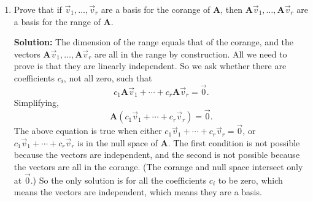 \documentclass[11pt,fleqn]{article}
\begin{document}
\begin{enumerate}
\item Prove that if $\vec{v}_1,\ldots,\vec{v}_r$ are a basis for the corange of $\mathbf{A}$, then $\mathbf{A}\vec{v}_1,\ldots,\mathbf{A}\vec{v}_r$ are a basis for the range of $\mathbf{A}$.

{\bf Solution:} The dimension of the range equals that of the corange, and the vectors $\mathbf{A}\vec{v}_1,\ldots,\mathbf{A}\vec{v}_r$ are all in the range by construction. All we need to prove is that they are linearly independent. So we ask whether there are coefficients $c_i$, not all zero, such that
\[c_1 \mathbf{A}\vec{v}_1 + \cdots+c_r\mathbf{A}\vec{v}_r = \vec{0}.\]
Simplifying,
\[\mathbf{A}(c_1 \vec{v}_1 + \cdots+c_r\vec{v}_r) = \vec{0}.\]
The above equation is true when either $c_1 \vec{v}_1 + \cdots+c_r\vec{v}_r=\vec{0}$, or $c_1 \vec{v}_1 + \cdots+c_r\vec{v}_r$ is in the null space of $\mathbf{A}$.
The first condition is not possible because the vectors are independent, and the second is not possible because the vectors are all in the corange.
(The corange and null space intersect only at $\vec{0}$.)
So the only solution is for all the coefficients $c_i$ to be zero, which means the vectors are independent, which means they are a basis.
\end{enumerate}
\end{document}
